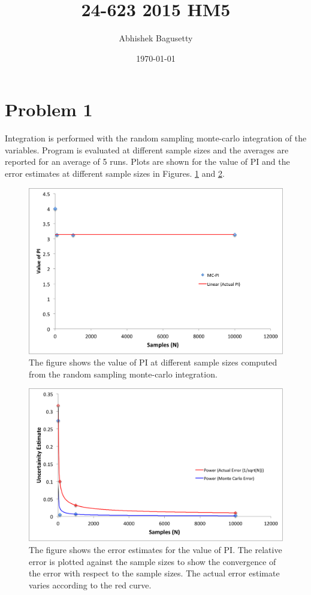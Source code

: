 \documentclass{article}
\author{Abhishek Bagusetty}
\date{\today}
\title{24-623 2015 HM5}
\begin{document}
\maketitle

\section{Problem 1}
\label{sec-1}
Integration is performed with the random sampling monte-carlo integration of the variables. 
Program is evaluated at different sample sizes and the averages are reported for an average of 5 runs. Plots are shown for the value of PI and the error estimates at different sample sizes in Figures. \ref{fig:P1a} and \ref{fig:P1b}.

\begin{figure}[htb]
\centering
\includegraphics[width=.9\linewidth]{./P1/PI.png}
\caption{\label{fig:P1a}The figure shows the value of PI at different sample sizes computed from the random sampling monte-carlo integration.}
\end{figure}

\begin{figure}[htb]
\centering
\includegraphics[width=.9\linewidth]{./P1/Error-Estimate.png}
\caption{\label{fig:P1b}The figure shows the error estimates for the value of PI. The relative error is plotted against the sample sizes to show the convergence of the error with respect to the sample sizes. The actual error estimate varies according to the red curve.}
\end{figure}
\end{document}
